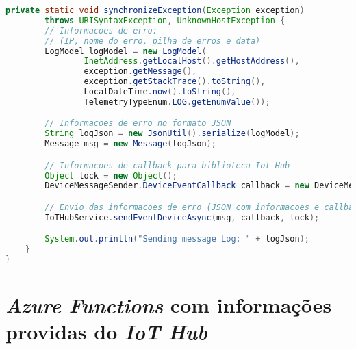 \begin{lstlisting}[language={Java}, label=leitura-log-placa]
    private static void synchronizeException(Exception exception)
        throws URISyntaxException, UnknownHostException {
        // Informacoes de erro:
        // (IP, nome do erro, pilha de erros e data)
        LogModel logModel = new LogModel(
                InetAddress.getLocalHost().getHostAddress(),
                exception.getMessage(),
                exception.getStackTrace().toString(),
                LocalDateTime.now().toString(),
                TelemetryTypeEnum.LOG.getEnumValue());

        // Informacoes de erro no formato JSON
        String logJson = new JsonUtil().serialize(logModel);
        Message msg = new Message(logJson);

        // Informacoes de callback para biblioteca Iot Hub
        Object lock = new Object();
        DeviceMessageSender.DeviceEventCallback callback = new DeviceMessageSender.DeviceEventCallback();

        // Envio das informacoes de erro (JSON com informacoes e callback)
        IoTHubService.sendEventDeviceAsync(msg, callback, lock);

        System.out.println("Sending message Log: " + logJson);
    }
}
\end{lstlisting}

\section{\textit{Azure Functions} com informações providas do \textit{IoT Hub}}


